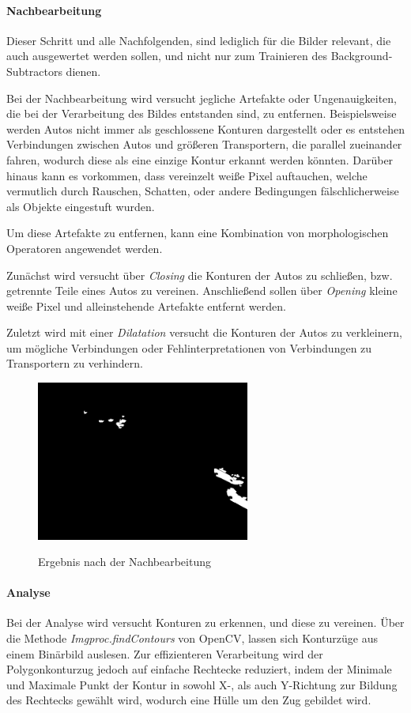 \paragraph*{Nachbearbeitung}
Dieser Schritt und alle Nachfolgenden, sind lediglich für die Bilder relevant, die auch ausgewertet werden sollen, und nicht nur zum Trainieren des Background-Subtractors dienen.

Bei der Nachbearbeitung wird versucht jegliche Artefakte oder Ungenauigkeiten, die bei der Verarbeitung des Bildes entstanden sind, zu entfernen.
Beispielsweise werden Autos nicht immer als geschlossene Konturen dargestellt oder es entstehen Verbindungen zwischen Autos und größeren Transportern, die parallel zueinander fahren, wodurch diese als eine einzige Kontur erkannt werden könnten. Darüber hinaus kann es vorkommen, dass vereinzelt weiße Pixel auftauchen, welche vermutlich durch Rauschen, Schatten, oder andere Bedingungen fälschlicherweise als Objekte eingestuft wurden.

Um diese Artefakte zu entfernen, kann eine Kombination von morphologischen Operatoren angewendet werden.

Zunächst wird versucht über {\em Closing} die Konturen der Autos zu schließen, bzw. getrennte Teile eines Autos zu vereinen.
Anschließend sollen über {\em Opening} kleine weiße Pixel und alleinstehende Artefakte entfernt werden.

Zuletzt wird mit einer {\em Dilatation} versucht die Konturen der Autos zu verkleinern, um mögliche Verbindungen oder Fehlinterpretationen von Verbindungen zu Transportern zu verhindern.

\begin{figure}[ht]
   \centering
     \includegraphics[width=7cm]{Bilder/process/4} \\
 \caption{Ergebnis nach der Nachbearbeitung}
\end{figure}

\paragraph*{Analyse}
Bei der Analyse wird versucht Konturen zu erkennen, und diese zu vereinen.
Über die Methode {\em Imgproc.findContours} von OpenCV, lassen sich Konturzüge aus einem Binärbild auslesen.
Zur effizienteren Verarbeitung wird der Polygonkonturzug jedoch auf einfache Rechtecke reduziert, indem der Minimale und Maximale Punkt der Kontur in sowohl X-, als auch Y-Richtung zur Bildung des Rechtecks gewählt wird, wodurch eine Hülle um den Zug gebildet wird.

